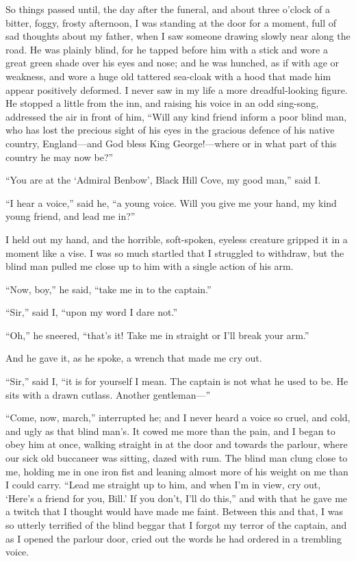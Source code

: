 So things passed until, the day after the funeral, and about three o’clock of a bitter, foggy, frosty afternoon, I was standing at the door for a moment, full of sad thoughts about my father, when I saw someone drawing slowly near along the road. He was plainly blind, for he tapped before him with a stick and wore a great green shade over his eyes and nose; and he was hunched, as if with age or weakness, and wore a huge old tattered sea-cloak with a hood that made him appear positively deformed. I never saw in my life a more dreadful-looking figure. He stopped a little from the inn, and raising his voice in an odd sing-song, addressed the air in front of him, \enquote{Will any kind friend inform a poor blind man, who has lost the precious sight of his eyes in the gracious defence of his native country, England---and God bless King George!---where or in what part of this country he may now be?}

\enquote{You are at the \enquote{Admiral Benbow}, Black Hill Cove, my good man,} said I.

\enquote{I hear a voice,} said he, \enquote{a young voice. Will you give me your hand, my kind young friend, and lead me in?}

I held out my hand, and the horrible, soft-spoken, eyeless creature gripped it in a moment like a vise. I was so much startled that I struggled to withdraw, but the blind man pulled me close up to him with a single action of his arm.

\enquote{Now, boy,} he said, \enquote{take me in to the captain.}

\enquote{Sir,} said I, \enquote{upon my word I dare not.}

\enquote{Oh,} he sneered, \enquote{that’s it! Take me in straight or I’ll break your arm.}

And he gave it, as he spoke, a wrench that made me cry out.

\enquote{Sir,} said I, \enquote{it is for yourself I mean. The captain is not what he used to be. He sits with a drawn cutlass. Another gentleman---}

\enquote{Come, now, march,} interrupted he; and I never heard a voice so cruel, and cold, and ugly as that blind man’s. It cowed me more than the pain, and I began to obey him at once, walking straight in at the door and towards the parlour, where our sick old buccaneer was sitting, dazed with rum. The blind man clung close to me, holding me in one iron fist and leaning almost more of his weight on me than I could carry. \enquote{Lead me straight up to him, and when I’m in view, cry out, ‘Here’s a friend for you, Bill.’ If you don’t, I’ll do this,} and with that he gave me a twitch that I thought would have made me faint. Between this and that, I was so utterly terrified of the blind beggar that I forgot my terror of the captain, and as I opened the parlour door, cried out the words he had ordered in a trembling voice.

